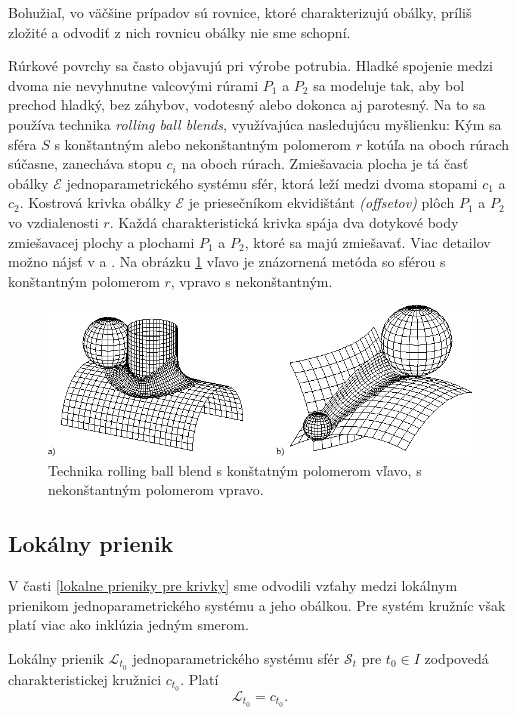 Bohužiaľ, vo väčšine prípadov sú rovnice, ktoré charakterizujú obálky, príliš zložité a odvodiť z nich rovnicu obálky nie sme schopní.

Rúrkové povrchy sa často objavujú pri výrobe potrubia. Hladké spojenie medzi dvoma nie nevyhnutne valcovými rúrami $P_1$ a $P_2$ sa modeluje tak, aby bol prechod hladký, bez záhybov, vodotesný alebo dokonca aj parotesný. Na to sa používa technika \textit{rolling ball blends}, využívajúca nasledujúcu myšlienku: Kým sa sféra $S$ s konštantným alebo nekonštantným polomerom $r$ kotúľa na oboch rúrach súčasne, zanecháva stopu $c_i$ na oboch rúrach. Zmiešavacia plocha je tá časť obálky $\mathcal{E}$ jednoparametrického systému sfér, ktorá leží medzi dvoma stopami $c_1$ a $c_2$. Kostrová krivka obálky $\mathcal{E}$ je priesečníkom ekvidištánt \textit{(offsetov)} plôch $P_1$ a $P_2$ vo vzdialenosti $r$. Každá charakteristická krivka spája dva dotykové body zmiešavacej plochy a plochami $P_1$ a $P_2$, ktoré sa majú zmiešavať. Viac detailov možno nájsť v \cite{Kar00} a \cite{Ode20}. Na obrázku \ref{fig:rolling_ball_blends} vľavo je znázornená metóda so sférou s konštantným polomerom $r$, vpravo s nekonštantným.

\begin{figure}[H]
	\centering
	\includegraphics[width=\textwidth]{images/rolling_ball_blends.png}
	\caption[Technika rolling ball blends.]{Technika rolling ball blend s konštatným polomerom vľavo, s nekonštantným polomerom vpravo. \cite{Rollingballblends}}
	\label{fig:rolling_ball_blends}
\end{figure}

\subsection{Lokálny prienik}
V časti \ref{lokalne prieniky pre krivky} sme odvodili vzťahy medzi lokálnym prienikom jednoparametrického systému a jeho obálkou. Pre systém kružníc však platí viac ako inklúzia jedným smerom.

\begin{lemma} \label{lema o lokalnom prieniku sfer}
Lokálny prienik $\mathcal{L}_{t_0}$ jednoparametrického systému sfér $\mathcal{S}_t$ pre $t_0 \in I$ zodpovedá charakteristickej kružnici $c_{t_0}$. Platí $$
\mathcal{L}_{t_0} = c_{t_0}.
$$
\end{lemma}

